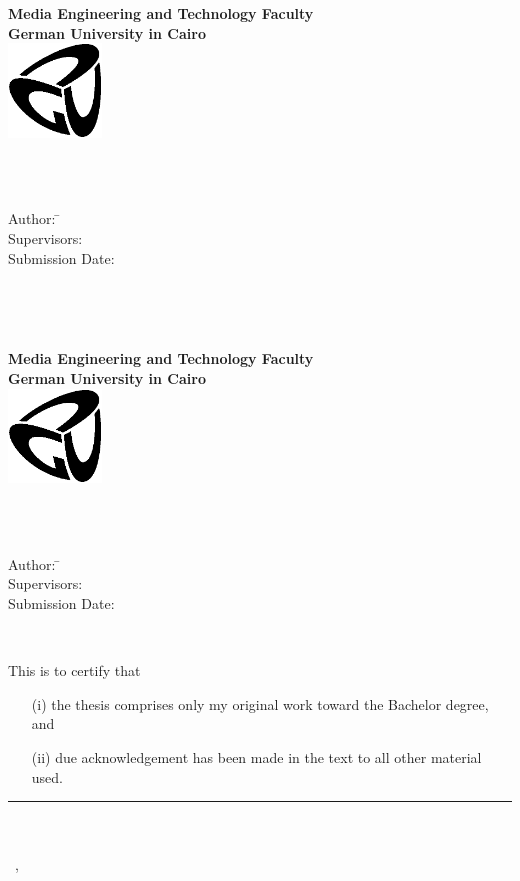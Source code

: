 \newcommand{\titlePage}{

  \thispagestyle{empty}
  \begin{center}
    \textbf{Media Engineering and Technology Faculty}\\[1mm]
    \textbf{German University in Cairo}\\[1mm]
    \includegraphics[width=2.5cm]{GUC-logo-ss.eps}

    \vspace{2cm}
    \doublespacing
    {\Huge \textbf{\titleOfThesisOne}}\\
    \singlespacing
    \vspace{2cm}
    {\large \textbf{\typeOfThesis}}\\

    \vfill
    \parbox{1cm}{
      \begin{large}
        \begin{tabbing}
          Author: \hspace{2cm}
          \=\authorOfThesis\\[2mm]
          Supervisors:
          \>\supervisorOne\\[2mm]
          Submission Date:
          \>\submissionDate\\
        \end{tabbing}
      \end{large}
    }\\
  \end{center}
  \clearpage
}
\titlePage
\thispagestyle{empty}\ \clearpage
\titlePage
\thispagestyle{empty}
This is to certify that
\begin{itemize}
  \item[(i)] the thesis comprises only my original work toward the Bachelor degree, and
  \item[(ii)] due acknowledgement has been made in the text to all other material used.
\end{itemize}

\vspace{2cm}
\begin{flushright}
  \rule[0mm]{6cm}{0.2mm}\\
  \authorOfThesis\\
  \submissionDay~\submissionMonth,~\submissionYear\\
\end{flushright}
\clearpage
